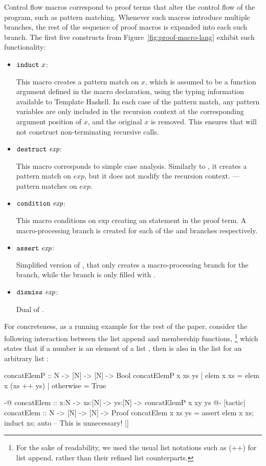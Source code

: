 Control flow macros correspond to proof terms that alter the control
flow of the program, such as pattern matching. Whenever such macros
introduce multiple branches, the rest of the sequence of proof macros
is expanded into each such branch. The first five constructs from
Figure~\ref{fig:proof-macro-lang} exhibit such functionality:

\begin{itemize}
\item $\mathtt{induct} ~ x$:

  This macro creates a pattern match on $x$, which is assumed to be a
  function argument defined in the macro declaration, using the typing
  information available to Template Haskell.  In each case of the
  pattern match, any pattern variables are only included in the recursion
  context at the corresponding argument position of $x$, and the
  original $x$ is removed. This ensures that  will not construct
  non-terminating recursive calls.

\item $\mathtt{destruct} ~ \textit{exp}$:

  This macro corresponds to simple case analysis. Similarly to
  , it creates a pattern match on $\textit{exp}$, but it
  does not modify the recursion context.  --- pattern matches on
  $\textit{exp}$. 

\item $\mathtt{condition} ~ \textit{exp}$:

  This macro conditions on $\text{exp}$ creating an  statement
  in the proof term. A macro-processing branch is created for each of
  the  and  branches respectively.

\item $\mathtt{assert} ~ \textit{exp}$:

  Simplified version of , that only creates a
  macro-processing branch for the  branch, while the
   branch is only filled with .
  
\item $\mathtt{dismiss} ~ \textit{exp}$:

  Dual of .

\end{itemize}

For concreteness, as a running example for the rest of the paper, consider
the following interaction between the list append and membership functions,
\footnote{For the sake of readability, we used the usual list
  notations such as (++) for list append, rather than their refined
  list counterparts.}%
%
which states that if a number  is an element of a list ,
then  is also in the list  for an arbitrary list :
\begin{code}
  concatElemP :: N -> [N] -> [N] -> Bool
  concatElemP x xs ys
    | elem x xs = elem x (xs ++ ys)
    | otherwise = True

  {-@ concatElem :: x:N -> xs:[N] -> ys:[N] ->
      {concatElemP x xy ys} @-}
  [tactic|
  concatElem :: N -> [N] -> [N] -> Proof
  concatElem x xs ys =
    assert {elem x xs};
    induct xs;
    auto -- This is unnecessary!
  |]
\end{code}

